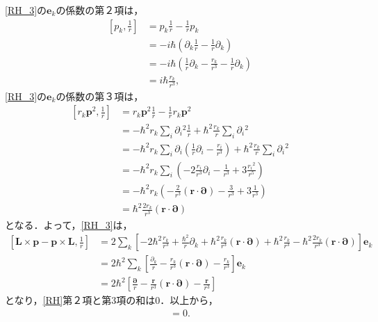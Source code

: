\eqref{RH_3}の$\boldsymbol{e}_k$の係数の第２項は，
\begin{align*}
  \left[p_k,\frac{1}{r}\right]
  & = p_k\frac{1}{r} - \frac{1}{r}p_k\\
  & = - i\hbar\left(\partial_k\frac{1}{r} - \frac{1}{r}\partial_k\right)\\
  & = - i\hbar\left(\frac{1}{r}\partial_k - \frac{r_k}{r^3} - \frac{1}{r}\partial_k\right)\\
  & = i\hbar\frac{r_k}{r^3},
\end{align*}
\eqref{RH_3}の$\boldsymbol{e}_k$の係数の第３項は，
\begin{align*}
  \left[r_k\boldsymbol{p}^2,\frac{1}{r}\right]
  & = r_k\boldsymbol{p}^2\frac{1}{r} - \frac{1}{r}r_k\boldsymbol{p}^2\\
  & = - \hbar^2r_k\sum_i\partial_i{}^2\frac{1}{r} + \hbar^2\frac{r_k}{r}\sum_i\partial_i{}^2\\
  & = - \hbar^2r_k\sum_i\partial_i\left(\frac{1}{r}\partial_i - \frac{r_i}{r^3}\right) + \hbar^2\frac{r_k}{r}\sum_i\partial_i{}^2\\
  & = - \hbar^2r_k\sum_i\left( - 2\frac{r_i}{r^3}\partial_i - \frac{1}{r^3} + 3\frac{r_i{}^2}{r^5}\right)\\
  & = - \hbar^2r_k\left( - \frac{2}{r^3}(\boldsymbol{r}\cdot\boldsymbol{\partial}) - \frac{3}{r^3} + 3\frac{1}{r^3}\right)\\
  & = \hbar^2\frac{2r_k}{r^3}(\boldsymbol{r}\cdot\boldsymbol{\partial})
\end{align*}
となる．よって，\eqref{RH_3}は，
\begin{align*}
  \left[\boldsymbol{L}\times\boldsymbol{p} - \boldsymbol{p}\times\boldsymbol{L},\frac{1}{r}\right]
  & = 2\sum_k\left[ - 2\hbar^2\frac{r_k}{r^3} + \frac{\hbar^2}{r}\partial_k + \hbar^2\frac{r_k}{r^3}(\boldsymbol{r}\cdot\boldsymbol{\partial}) + \hbar^2\frac{r_k}{r^3} - \hbar^2\frac{2r_k}{r^3}(\boldsymbol{r}\cdot\boldsymbol{\partial})\right]\boldsymbol{e}_k\\
  & = 2\hbar^2\sum_k\left[\frac{\partial_k}{r} - \frac{r_k}{r^3}(\boldsymbol{r}\cdot\boldsymbol{\partial}) - \frac{r_k}{r^3}\right]\boldsymbol{e}_k\\
  & = 2\hbar^2\left[\frac{\boldsymbol{\partial}}{r} - \frac{\boldsymbol{r}}{r^3}(\boldsymbol{r}\cdot\boldsymbol{\partial}) - \frac{\boldsymbol{r}}{r^3}\right]
\end{align*}
となり，\eqref{RH}第２項と第3項の和は$0$．以上から，
\begin{align}
  [\boldsymbol{R},H]=0.
\end{align}

